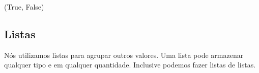 \documentclass[letterpaper,10pt,english]{jupyterBook}
\begin{document}
\begin{sphinxVerbatim}[commandchars=\\\{\}]
  
  
 
\end{sphinxVerbatim}

\begin{sphinxVerbatim}[commandchars=\\\{\}]
(True, False)
\end{sphinxVerbatim}


\subsection{Listas}
\label{\detokenize{chapters/2:listas}}
\sphinxAtStartPar
Nós utilizamos listas para agrupar outros valores. Uma lista pode armazenar qualquer tipo e em qualquer quantidade. Inclusive podemos fazer listas de listas.

\begin{sphinxVerbatim}[commandchars=\\\{\}]
  \PYG{p}{[}   \PYG{p}{]}
\end{sphinxVerbatim}

\begin{sphinxVerbatim}
\end{sphinxVerbatim}

\begin{sphinxVerbatim}[commandchars=\\\{\}]
  \PYG{p}{[}  \PYG{p}{]}
\end{sphinxVerbatim}

\begin{sphinxVerbatim}
\end{sphinxVerbatim}
\end{document}
